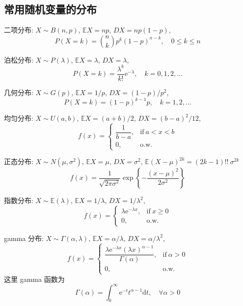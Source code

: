 \documentclass[openany]{ctexbook}
\theoremstyle{kaiti}
\theoremstyle{normal}
\begin{document}
\subsection{常用随机变量的分布}

二项分布: $X\sim B(n,p)$, $\mathbb{E}X=np$, $DX=np(1-p)$,
\begin{equation}
  P(X=k)=\binom{n}{k}p^k(1-p)^{n-k},\quad0\leqslant k\leqslant n
\end{equation}


泊松分布: $X\sim P(\lambda)$, $\mathbb{E}X=\lambda$, $DX=\lambda$,
\begin{equation}
  P(X=k)=\frac{\lambda^k}{k!}\mathrm{e}^{-\lambda},\quad k=0,1,2,\ldots
\end{equation}


几何分布: $X\sim G(p)$, $\mathbb{E}X=1/p$, $DX=(1-p)/p^2$,
\begin{equation}
  P(X=k)=(1-p)^{k-1}p,\quad k=1,2,\ldots
\end{equation}


均匀分布: $X\sim U(a,b)$, $\mathbb{E}X=(a+b)/2$, $DX=(b-a)^2/12$,
\begin{equation}
  f(x)=\begin{cases}\dfrac{1}{b-a},&\text{if}~a<x<b\\0,&\text{o.w.}\end{cases}
\end{equation}


正态分布: $X\sim N(\mu,\sigma^2)$, $\mathbb{E}X=\mu$, $DX=\sigma^2$, $\mathbb{E}(X-\mu)^{2k}=(2k-1)!!~\sigma^{2k}$
\begin{equation}
  f(x)=\frac{1}{\sqrt{2\pi\sigma^2}}\exp\left\{-\frac{(x-\mu)^2}{2\sigma^2}\right\}
\end{equation}


指数分布: $X\sim \mathbb{E}(\lambda)$, $\mathbb{E}X=1/\lambda$, $DX=1/\lambda^2$,
\begin{equation}
  f(x)=\begin{cases}\lambda\mathrm{e}^{-\lambda x},&\text{if}~x\geqslant0\\0,&\text{o.w.}\end{cases}
\end{equation}


gamma 分布: $X\sim \Gamma(\alpha,\lambda)$, $\mathbb{E}X=\alpha/\lambda$, $DX=\alpha/\lambda^2$,
\begin{equation}
  f(x)=\begin{cases}\dfrac{\lambda\mathrm{e}^{-\lambda x}(\lambda x)^{\alpha-1}}{\Gamma(\alpha)},&\text{if}~\alpha>0\\0,&\text{o.w.}\end{cases}
\end{equation}
 这里 gamma 函数为
\begin{equation}
  \Gamma(\alpha)=\int_0^\infty \mathrm{e}^{-t}t^{\alpha-1}\mathrm{d}t,\quad\forall \alpha>0
\end{equation}
\end{document}
